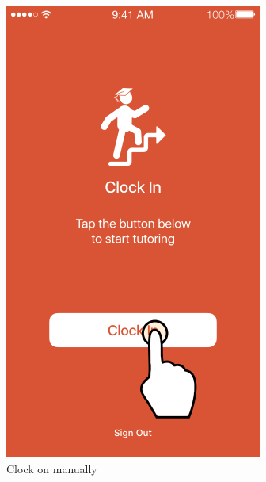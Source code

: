 \documentclass[12pt,a4paper,]{article}
\begin{document}
\begin{figure}[p]
\centering
\includegraphics[]{3c23c7e0b0.png}
\caption{Clock on manually}
\label{clockonmanual}
\end{figure}
\end{document}
